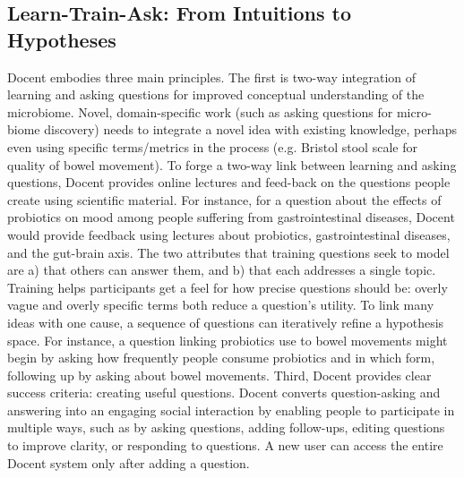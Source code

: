 \subsection{Learn-Train-Ask: From Intuitions to Hypotheses}
Docent embodies three main principles. The first is two-way integration of learning and asking questions for improved conceptual understanding of the microbiome. Novel, domain-specific work (such as asking questions for micro-biome discovery) needs to integrate a novel idea with existing knowledge, perhaps even using specific terms/metrics in the process (e.g. Bristol stool scale for quality of bowel movement). To forge a two-way link between learning and asking questions, Docent provides online lectures and feed-back on the questions people create using scientific material. For instance, for a question about the effects of probiotics on mood among people suffering from gastrointestinal diseases, Docent would provide feedback using lectures about probiotics, gastrointestinal diseases, and the gut-brain axis.
The two attributes that training questions seek to model are a) that others can answer them, and b) that each addresses a single topic. Training helps participants get a feel for how precise questions should be: overly vague and overly specific terms both reduce a question’s utility. To link many ideas with one cause, a sequence of questions can iteratively refine a hypothesis space. For instance, a question linking probiotics use to bowel movements might begin by asking how frequently people consume probiotics and in which form, following up by asking about bowel movements.
Third, Docent provides clear success criteria: creating useful questions. Docent converts question-asking and answering into an engaging social interaction by enabling people to participate in multiple ways, such as by asking questions, adding follow-ups, editing questions to improve clarity, or responding to questions. A new user can access the entire Docent system only after adding a question.

 
